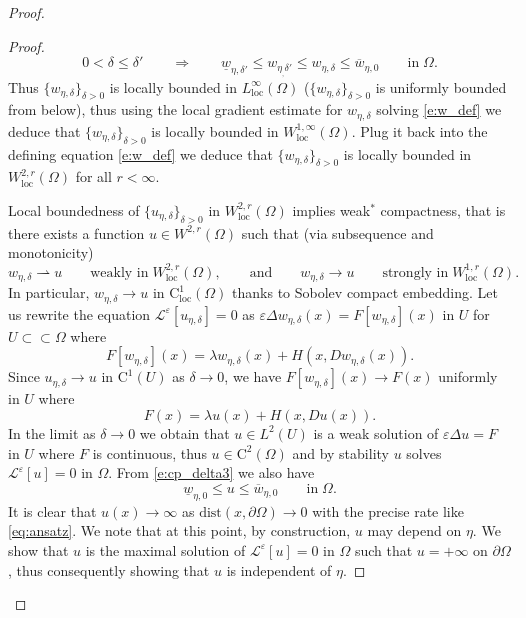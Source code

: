 \documentclass[11pt,reqno]{amsart}
\numberwithin{figure}{section}
\theoremstyle{plain}
\theoremstyle{remark}
\numberwithin{equation}{section}
\newcommand{\rup}{\rightharpoonup}
\begin{document}
\begin{proof}
\begin{proof}
    \begin{equation}\label{e:cp_delta3}
        0<\delta \leq \delta'\qquad\Longrightarrow\qquad \underline{w}_{\eta,\delta'} \leq w_{\eta_,\delta'}\leq w_{\eta,\delta} \leq \overline{w}_{\eta,0} \qquad\text{in}\;\Omega.
    \end{equation}
    Thus $\{w_{\eta,\delta}\}_{\delta>0}$ is locally bounded in $L^{\infty}_{\mathrm{loc}}(\Omega)$ ($\{w_{\eta,\delta}\}_{\delta>0}$ is uniformly bounded from below), thus using the local gradient estimate for $w_{\eta,\delta}$ solving \eqref{e:w_def} we deduce that $\{w_{\eta,\delta}\}_{\delta>0}$ is locally bounded in $W^{1,\infty}_{\mathrm{loc}}(\Omega)$. Plug it back into the defining equation \eqref{e:w_def} we deduce that $\{w_{\eta,\delta}\}_{\delta>0}$ is locally bounded in $W^{2,r}_{\mathrm{loc}}(\Omega)$ for all $r<\infty$.
    
    \noindent Local boundedness of $\{u_{\eta,\delta}\}_{\delta>0}$ in $W^{2,r}_{\mathrm{loc}}(\Omega)$ implies weak$^*$ compactness, that is there exists a function $u\in W^{2,r}(\Omega)$ such that (via subsequence and monotonicity)
    \begin{equation*}
        w_{\eta,\delta} \rup u \qquad\text{weakly in}\;W^{2,r}_{\mathrm{loc}}(\Omega),\qquad \text{and}\qquad
        w_{\eta,\delta} \to u \qquad\text{strongly in}\;W^{1,r}_{\mathrm{loc}}(\Omega).
    \end{equation*}
    In particular, $w_{\eta,\delta}\to u$ in $\mathrm{C}^1_{\mathrm{loc}}(\Omega)$ thanks to Sobolev compact embedding. Let us rewrite the equation $\mathcal{L}^\varepsilon\left[u_{\eta,\delta}\right] = 0$ as $\varepsilon\Delta w_{\eta,\delta}(x) = F[w_{\eta,\delta}](x)$ in $U$ for $U\subset\subset \Omega$ where
    \begin{equation*}
        F[w_{\eta,\delta}](x) =  \lambda w_{\eta,\delta}(x) + H(x,Dw_{\eta,\delta}(x)).
    \end{equation*}
    Since $u_{\eta,\delta}\to u$ in $\mathrm{C}^1(U)$ as $\delta\to 0$, we have $F[w_{\eta,\delta}](x) \to F(x)$ uniformly in $U$ where 
    \begin{equation*}
        F(x) = \lambda u(x) + H(x,Du(x)).
    \end{equation*}
    In the limit as $\delta\to 0$ we obtain that $u\in L^2(U)$ is a weak solution of $\varepsilon\Delta u = F$ in $U$ where $F$ is continuous, thus $u\in \mathrm{C}^2(\Omega)$ and by stability $u$ solves $\mathcal{L}^\varepsilon[u] = 0$ in $\Omega$. From \eqref{e:cp_delta3} we also have
    \begin{equation*}
        \underline{w}_{\eta,0} \leq u \leq \overline{w}_{\eta,0} \qquad\text{in}\;\Omega.
    \end{equation*}
    It is clear that $u(x)\to \infty$ as $\mathrm{dist}(x,\partial\Omega)\to 0$ with the precise rate like \eqref{eq:ansatz}. We note that at this point, by construction, $u$ may depend on $\eta$. We show that $u$ is the maximal solution of $\mathcal{L}^\varepsilon[u] = 0$ in $\Omega$ such that $u = +\infty$ on $\partial\Omega$, thus consequently showing that $u$ is independent of $\eta$.
    

\end{proof}
\end{proof}
\end{document}
